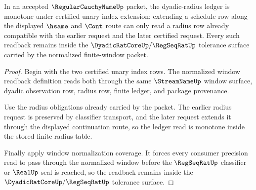 \begin{theorem}
\label{thm:regularcauchyname-radius-ledger-monotone-readback}
In an accepted $\RegularCauchyNameUp$ packet, the dyadic-radius ledger is monotone under certified unary index extension: extending a schedule row along the displayed $\hsame$ and $\Cont$ route can only read a radius row already compatible with the earlier request and the later certified request. Every such readback remains inside the $\DyadicRatCoreUp/\RegSeqRatUp$ tolerance surface carried by the normalized finite-window packet.
\end{theorem}
\begin{proof}
Begin with the two certified unary index rows. The normalized window readback definition reads both through the same $\StreamNameUp$ window surface, dyadic observation row, radius row, finite ledger, and package provenance.

Use the radius obligations already carried by the packet. The earlier radius request is preserved by classifier transport, and the later request extends it through the displayed continuation route, so the ledger read is monotone inside the stored finite radius table.

Finally apply window normalization coverage. It forces every consumer precision read to pass through the normalized window before the $\RegSeqRatUp$ classifier or $\RealUp$ seal is reached, so the readback remains inside the $\DyadicRatCoreUp/\RegSeqRatUp$ tolerance surface.
\end{proof}


